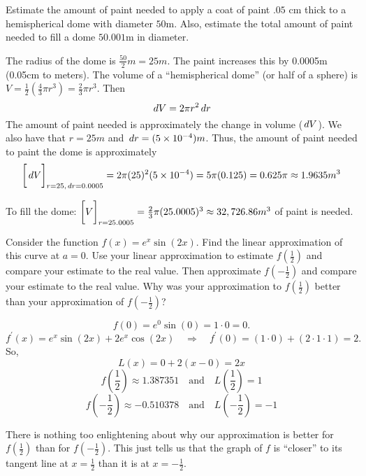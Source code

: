 \documentclass[nooutcomes]{ximera}
\begin{document}
\begin{problem}
Estimate the amount of paint needed to apply a coat of paint $.05$ cm thick to a hemispherical dome with diameter $50$m.  Also, estimate the total amount of paint needed to fill a dome $50.001$m in diameter.
		\begin{freeResponse}
		The radius of the dome is $\frac{50}{2}m=25m$.  The paint increases this by 0.0005m (0.05cm to meters).  The volume of a ``hemispherical dome'' (or half of a sphere) is $V = \frac{1}{2} \left(\frac{4}{3} \pi r^3 \right) = \frac{2}{3} \pi r^3$.  Then
		$$ \,d V = 2 \pi r^2 \,d r  $$
		The amount of paint needed is approximately the change in volume ($\,d V$).  We also have that $r=25m$ and $\,d r = (5 \times 10^{-4}) m$.  Thus, the amount of paint needed to paint the dome is approximately
		$$ \bigg[ \,d V \bigg]_{r=25,\,d r = 0.0005} = 2 \pi (25)^2 (5 \times 10^{-4}) = 5 \pi (0.125) = 0.625 \pi \approx 1.9635 m^3$$
		
		To fill the dome: $\bigg[ V \bigg]_{r=25.0005}=\frac{2}{3}\pi (25.0005)^3 \approx 32,726.86 m^3$ of paint is needed.
		\end{freeResponse}
			
			
		
\end{problem}
















\begin{problem}
Consider the function $f(x) = e^x \sin (2x)$.  Find the linear approximation of this curve at $a=0$.  Use your linear approximation to estimate $f\left( \frac{1}{2} \right)$ and compare your estimate to the real value.  Then approximate $f\left( - \frac{1}{2} \right)$ and compare your estimate to the real value.  Why was your approximation to $f\left( \frac{1}{2} \right)$ better than your approximation of $f\left( - \frac{1}{2} \right)$?  
		\begin{freeResponse}
		$$f(0) = e^0 \sin(0) = 1 \cdot 0 = 0.$$  
		$$f^\prime (x) = e^x \sin(2x) + 2e^x \cos(2x) \quad \Longrightarrow \quad f^\prime (0) = (1 \cdot 0) + (2 \cdot 1 \cdot 1) = 2.$$
		So,
		$$ L(x) = 0 + 2(x-0) = 2x $$
		$$ f \left( \frac{1}{2} \right) \approx 1.387351 \quad \text{and} \quad L\left( \frac{1}{2} \right) = 1 $$
		$$ f \left( - \frac{1}{2} \right) \approx -0.510378 \quad \text{and} \quad L\left( - \frac{1}{2} \right) = - 1 $$
		
		There is nothing too enlightening about why our approximation is better for $f\left( \frac{1}{2} \right)$ than for $f\left( - \frac{1}{2} \right)$.  This just tells us that the graph of $f$ is ``closer'' to its tangent line at $x=\frac{1}{2}$ than it is at $x=-\frac{1}{2}$.  
		\end{freeResponse}
			
			
	
\end{problem}
	
\end{document}
